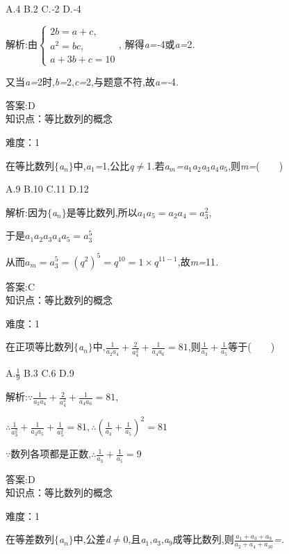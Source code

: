 \documentclass{article} %
\begin{document}
 A.4 B.2 C.\textit{-}2 D.\textit{-}4

 解析:由$\left\{
\begin{array}{l}
2b=a+c, \\
a^2=bc, \\
a+3b+c=10
\end{array}
\right.$, 解得\textit{a=-}4或\textit{a=}2\textit{.}

又当\textit{a=}2时,\textit{b=}2,\textit{c=}2,与题意不符,故\textit{a=-}4\textit{.}

 答案:D \\

知识点：等比数列的概念

难度：1

 在等比数列$\mathrm{\{}$\textit{a${}_{n}$}$\mathrm{\}}$中,\textit{a}${}_{1}$\textit{=}1,公比\textit{{\textbar}q{\textbar}}$\mathrm{\neq}$1\textit{.}若\textit{a${}_{m}$=a}${}_{1}$\textit{a}${}_{2}$\textit{a}${}_{3}$\textit{a}${}_{4}$\textit{a}${}_{5}$,则\textit{m=}(\textit{　　})

 A.9 B.10 C.11 D.12

 解析:因为$\mathrm{\{}$\textit{a${}_{n}$}$\mathrm{\}}$是等比数列,所以$a_1a_5=a_2a_4=a_3^2$,

于是$a_1a_2a_3a_4a_5=a_3^5$

从而$a_m=a_3^5=(q^2)^5=q^{10}=1\times q^{11-1}$,故\textit{m=}11\textit{.}

 答案:C \\

知识点：等比数列的概念

难度：1

 在正项等比数列$\mathrm{\{}$\textit{a${}_{n}$}$\mathrm{\}}$中,$\frac{1}{a_2a_4}+\frac{2}{a_4^2}+\frac{1}{a_4a_6}=81$,则$\frac{1}{a_3}+\frac{1}{a_5}$等于(\textit{　　})

 A.$\frac{1}{9}$ B.3 C.6 D.9

 解析:$\because \frac{1}{a_2a_4}+\frac{2}{a_4^2}+\frac{1}{a_4a_6}=81$,

$\therefore \frac{1}{a_3^2}+\frac{1}{a_3a_5}+\frac{1}{a_5^2}=81, \therefore (\frac{1}{a_3}+\frac{1}{a_5})^2=81$

\textit{$\because$}数列各项都是正数,$\therefore \frac{1}{a_3}+\frac{1}{a_5}=9$

 答案:D \\

知识点：等比数列的概念

难度：1

 在等差数列$\mathrm{\{}$\textit{a${}_{n}$}$\mathrm{\}}$中,公差\textit{d}$\mathrm{\neq}$0,且\textit{a}${}_{1}$,\textit{a}${}_{3}$,\textit{a}${}_{9}$成等比数列,则$\frac{a_1+a_3+a_9}{a_2+a_4+a_{10}}$\textit{=\underbar{　　　　}.~}
\end{document}
